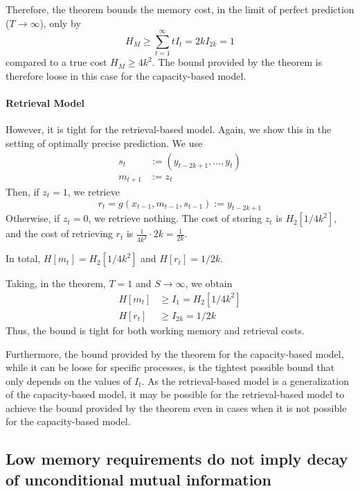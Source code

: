 \documentclass[11pt,letterpaper]{article}
\newcounter{theorem}
\begin{document}
Therefore, the theorem bounds the memory cost, in the limit of perfect prediction ($T\rightarrow \infty$), only by
\begin{equation}
    H_M \geq \sum_{t=1}^\infty t I_t = 2k I_{2k} = 1
\end{equation}
compared to a true cost $H_M \geq 4k^2$.
The bound provided by the theorem is therefore loose in this case for the capacity-based model.

\paragraph{Retrieval Model}
However, it is tight for the retrieval-based model.
Again, we show this in the setting of optimally precise prediction.
We use
\begin{align}
    s_t & := \left(y_{t-2k+1}, \dots, y_{t}\right) \\
    m_{t+1} & := z_t
\end{align}
Then, if $z_t = 1$, we retrieve
\begin{equation}
    r_t = g(x_{t-1}, m_{t-1}, s_{t-1}) := y_{t-2k+1}
\end{equation}
Otherwise, if $z_t=0$, we retrieve nothing.
The cost of storing $z_t$ is $H_2[1/4k^2]$, and the cost of retrieving $r_t$ is $\frac{1}{4k^2} \cdot 2k = \frac{1}{2k}$.



In total, $H[m_t] = H_2[1/4k^2]$ and $H[r_t] = 1/2k$.

Taking, in the theorem, $T=1$ and $S\rightarrow\infty$, we obtain 
\begin{align}
    H[m_t] &\geq I_1 = H_2[1/4k^2] \\
    H[r_t] &\geq I_{2k} = 1/2k
\end{align}
Thus, the bound is tight for both working memory and retrieval costs.


Furthermore, the bound provided by the theorem for the capacity-based model, while it can be loose for specific processes, is the tightest possible bound that only depends on the values of $I_t$.
As the retrieval-based model is a generalization of the capacity-based model, it may be possible for the retrieval-based model to achieve the bound provided by the theorem even in cases when it is not possible for the capacity-based model.


\subsection{Low memory requirements do not imply decay of unconditional mutual information}
\end{document}
